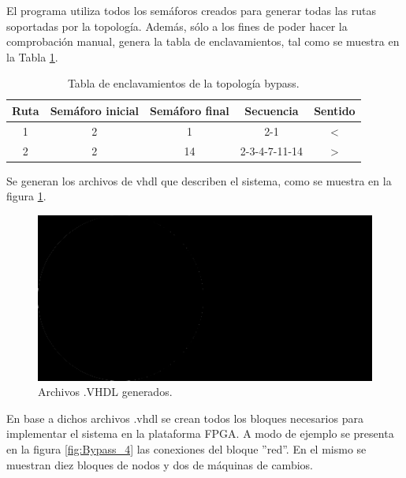 	El programa utiliza todos los semáforos creados para generar todas las rutas soportadas por la topología. Además, sólo a los fines de poder hacer la comprobación manual, genera la tabla de enclavamientos, tal como se muestra en la Tabla \ref{tabla_bypass}.

	\begin{table}[!hbt]
	\caption{Tabla de enclavamientos de la topología bypass.}
	\label{tabla_bypass}
	\centering
	\begin{tabular}{ c  c  c  c  c }
	\hline
	Ruta & Semáforo inicial & Semáforo final & Secuencia & Sentido \\	
	\hline
		1 & 2 & 1 & 2-1 & < \\
		2 & 2 & 14 & 2-3-4-7-11-14 & > \\
	\end{tabular}
	\end{table}	
	
	Se generan los archivos de vhdl que describen el sistema, como se muestra en la figura \ref{fig:Bypass_3}.
	
	\begin{figure}[h]
	\centering
	\includegraphics[scale=0.5]{./Figures/XXX}
		\caption{Archivos .VHDL generados.}
		\label{fig:Bypass_3}
	\end{figure}
	
	En base a dichos archivos .vhdl se crean todos los bloques necesarios para implementar el sistema en la plataforma FPGA. A modo de ejemplo se presenta en la figura \ref{fig:Bypass_4} las conexiones del bloque ''red''. En el mismo se muestran diez bloques de nodos y dos de máquinas de cambios. 
	
